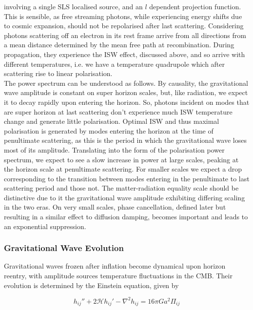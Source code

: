 \documentclass[a4paper,10pt]{article}
\begin{document}
involving a single SLS localised source, and an $l$ dependent projection function. This is sensible, as free streaming photons, while experiencing energy shifts due to cosmic expansion, should not be repolarised after last scattering. Considering photons scattering off an electron in its rest frame arrive from all directions from a mean distance determined by the mean free path at recombination. During propagation, they experience the ISW effect, discussed above, and so arrive with different temperatures, i.e. we have a temperature quadrupole which after scattering rise to linear polarisation. \\

The power spectrum can be understood as follows. By causality, the gravitational wave amplitude is constant on super horizon scales, but, like radiation, we expect it to decay rapidly upon entering the horizon. So, photons incident on modes that are super horizon at last scattering don't experience much ISW temperature change and generate little polarisation. Optimal ISW and thus maximal polarisation is generated by modes entering the horizon at the time of penultimate scattering, as this is the period in which the gravitational wave loses most of its amplitude. Translating into the form of the polarisation power spectrum, we expect to see a slow increase in power at large scales, peaking at the horizon scale at penultimate scattering. For smaller scales we expect a drop corresponding to the transition between modes entering in the penultimate to last scattering period and those not. The matter-radiation equality scale should be distinctive due to it the gravitational wave amplitude exhibiting differing scaling in the two eras. On very small scales, phase cancellation, defined later but resulting in a similar effect to diffusion damping, becomes important and leads to an exponential suppression. 

\subsubsection{Gravitational Wave Evolution}
\label{evolution}

Gravitational waves frozen after inflation become dynamical upon horizon reentry, with amplitude sources temperature fluctuations in the CMB. Their evolution is determined by the Einstein equation, given by \cite{Pritchard}

\begin{equation}
h_{ij}''+2\mathcal{H}h_{ij}'-\nabla^2h_{ij} = 16\pi Ga^2\Pi_{ij}
\end{equation}
\end{document}
